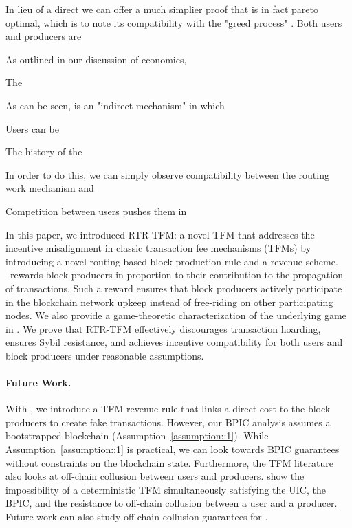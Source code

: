  


In lieu of a direct we can offer a much simplier proof that \ourTFM is in fact pareto optimal, which is to note its compatibility with the "greed process" . Both users and producers are 

As outlined in our discussion of economics, 


The 

As can be seen, \ourTFM is an "indirect mechanism" in which

Users can be



The history of the 




In order to do this, we can simply observe compatibility between the routing work mechanism and 




Competition between users pushes them in 

In this paper, we introduced \textsc{RTR-TFM}: a novel TFM that addresses the incentive misalignment in classic transaction fee mechanisms (TFMs) by introducing a novel routing-based block production rule and a revenue scheme. \ourTFM\ rewards block producers in proportion to their contribution to the propagation of transactions. Such a reward ensures that block producers actively participate in the blockchain network upkeep instead of free-riding on other participating nodes. We also provide a game-theoretic characterization of the underlying game in \ourTFM. We prove that \textsc{RTR-TFM} effectively discourages transaction hoarding, ensures Sybil resistance, and achieves incentive compatibility for both users and block producers under reasonable assumptions.

\paragraph{Future Work.} With \ourTFM, we introduce a TFM revenue rule that links a direct cost to the block producers to create fake transactions. However, our BPIC analysis assumes a bootstrapped blockchain (Assumption~\ref{assumption::1}). While Assumption~\ref{assumption::1} is practical, we can look towards BPIC guarantees without constraints on the blockchain state. Furthermore, the TFM literature also looks at off-chain collusion between users and producers. \cite{gafni2024barriers} show the impossibility of a deterministic TFM simultaneously satisfying the UIC, the BPIC, and the resistance to off-chain collusion between a user and a producer. Future work can also study off-chain collusion guarantees for \ourTFM.

